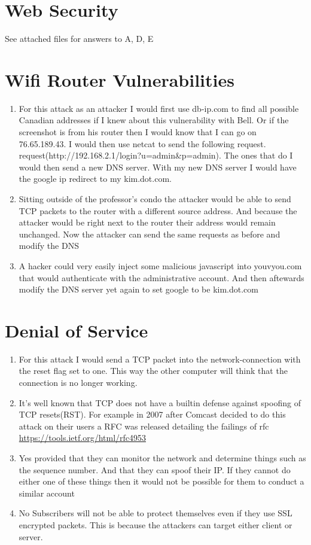\documentclass{article}
\begin{document}
\section{Web Security}
See attached files for answers to A, D, E

\section{Wifi Router Vulnerabilities}
\begin{enumerate}[A]
	\item
		For this attack as an attacker I would first use db-ip.com to find all
		possible Canadian addresses if I knew about this vulnerability with
		Bell. Or if the screenshot is from his router then I would know that I
		can go on 76.65.189.43. 
		I would then use netcat to send the following request.
		request(http://192.168.2.1/login?u=admin&p=admin). The ones that do I
		would then send a new DNS server. With my new DNS server I would have
		the google ip redirect to my kim.dot.com.
	\item
		Sitting outside of the professor's condo the attacker would be able to
		send TCP packets to the router with a different source address. And
		because the attacker would be right next to the router their address
		would remain unchanged. Now the attacker can send the same requests as
		before and modify the DNS 
	\item
		A hacker could very easily inject some malicious javascript into
		youvyou.com that would authenticate with the administrative account. And
		then aftewards modify the DNS server yet again to set google to be
		kim.dot.com
\end{enumerate}

\section{Denial of Service}
\begin{enumerate}[A]
	\item
		For this attack I would send a TCP packet into the network-connection
		with the reset flag set to one. This way the other computer will think
		that the connection is no longer working.
	\item 
		It's well known that TCP does not have a builtin defense against
		spoofing of TCP resets(RST). For example in 2007 after Comcast decided
		to do this attack on their users a RFC was released detailing the
		failings of rfc \url{https://tools.ietf.org/html/rfc4953}
	\item
		Yes provided that they can monitor the network and determine things such
		as the sequence number. And that they can spoof their IP. If they cannot
		do either one of these things then it would not be possible for them to
		conduct a similar account
	\item
		No Subscribers will not be able to protect themselves even if they use
		SSL encrypted packets. This is because the attackers can target either
		client or server.
\end{enumerate}
\end{document}
